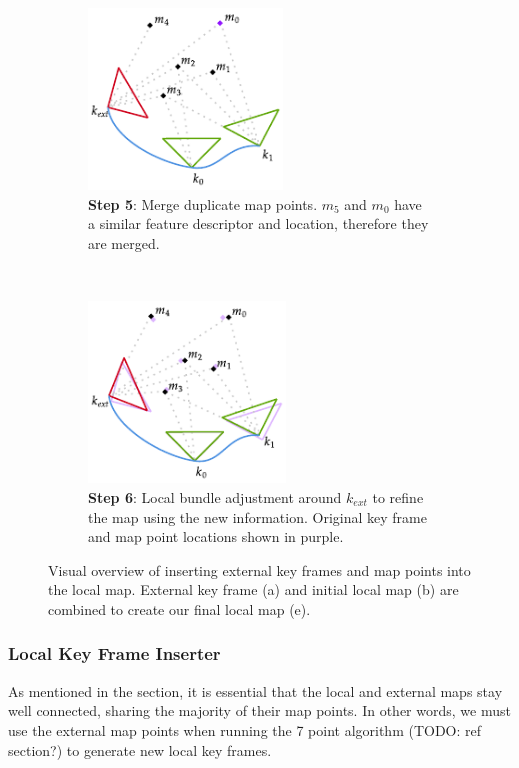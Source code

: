 \begin{figure}[h]
\begin{subfigure}[t]{0.333\textwidth}
    \end{subfigure}%
    ~
    \begin{subfigure}[t]{0.333\textwidth}
        \centering
        \includegraphics[height=1.9in]{figures/external_key_frame_insertion_4.pdf}
        \caption{\textbf{Step 5}: Merge duplicate map points. $m_5$ and $m_0$ have a similar feature descriptor and location, therefore they are merged.}
    \end{subfigure}%
    ~
    \begin{subfigure}[t]{0.333\textwidth}
        \centering
        \includegraphics[height=1.9in]{figures/external_key_frame_insertion_5.pdf}
        \caption{\textbf{Step 6}: Local bundle adjustment around $k_{ext}$ to refine the map using the new information. Original key frame and map point locations shown in purple.}
    \end{subfigure}%

    \caption{Visual overview of inserting external key frames and map points into the local map. External key frame (a) and initial local map (b) are combined to create our final local map (e).}

\end{figure}

\subsubsection{Local Key Frame Inserter}
\label{sec:local-key-frame-inserter}
As mentioned in the  section, it is essential that the local and external maps stay well connected, sharing the majority of their map points. In other words, we must use the external map points when running the 7 point algorithm (TODO: ref section?) to generate new local key frames.

